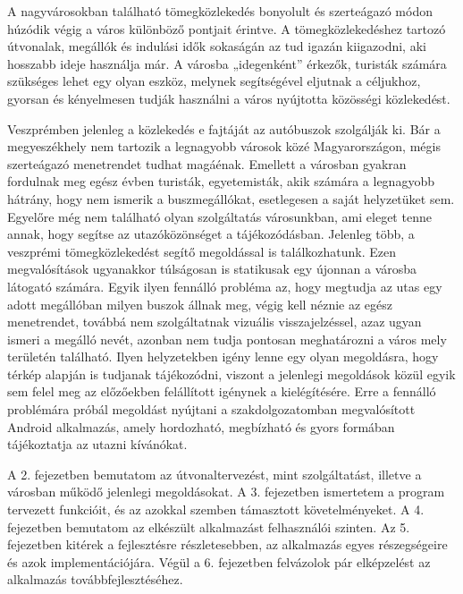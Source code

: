 
A nagyvárosokban található tömegközlekedés bonyolult és szerteágazó módon húzódik végig a város különböző pontjait érintve. 
A tömegközlekedéshez tartozó útvonalak, megállók és indulási idők sokaságán az tud igazán kiigazodni, aki hosszabb ideje használja már. 
A városba „idegenként” érkezők, turisták számára szükséges lehet egy olyan eszköz, melynek segítségével eljutnak a céljukhoz, gyorsan és kényelmesen tudják használni a város nyújtotta közösségi közlekedést. 

Veszprémben jelenleg a közlekedés e fajtáját az autóbuszok szolgálják ki. 
Bár a megyeszékhely nem tartozik a legnagyobb városok közé Magyarországon, mégis szerteágazó menetrendet tudhat magáénak. 
Emellett a városban gyakran fordulnak meg egész évben turisták, egyetemisták, akik számára a legnagyobb hátrány, hogy nem ismerik a buszmegállókat, esetlegesen a saját helyzetüket sem. 
Egyelőre még nem található olyan szolgáltatás városunkban, ami eleget tenne annak, hogy segítse az utazóközönséget a tájékozódásban.
Jelenleg több, a veszprémi tömegközlekedést segítő megoldással is találkozhatunk. 
Ezen megvalósítások ugyanakkor túlságosan is statikusak egy újonnan a városba látogató számára. 
Egyik ilyen fennálló probléma az, hogy megtudja az utas egy adott megállóban milyen buszok állnak meg, végig kell néznie az egész menetrendet, továbbá nem szolgáltatnak vizuális visszajelzéssel, azaz ugyan ismeri a megálló nevét, azonban nem tudja pontosan meghatározni a város mely területén található. 
Ilyen helyzetekben igény lenne egy olyan megoldásra, hogy térkép alapján is tudjanak tájékozódni, viszont a jelenlegi megoldások közül egyik sem felel meg az előzőekben felállított igénynek a kielégítésére.
Erre a fennálló problémára próbál megoldást nyújtani a szakdolgozatomban megvalósított Android alkalmazás, amely hordozható, megbízható és gyors formában tájékoztatja az utazni kívánókat. 

A 2. fejezetben bemutatom az útvonaltervezést, mint szolgáltatást, illetve a városban működő jelenlegi megoldásokat. 
A 3. fejezetben ismertetem a program tervezett funkcióit, és az azokkal szemben támasztott követelményeket.
A 4. fejezetben bemutatom az elkészült alkalmazást felhasználói szinten.
Az 5. fejezetben kitérek a fejlesztésre részletesebben, az alkalmazás egyes részegségeire és azok implementációjára. 
Végül a 6. fejezetben felvázolok pár elképzelést az alkalmazás továbbfejlesztéséhez.
